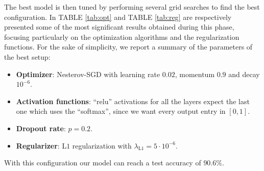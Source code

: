 \documentclass[prl,twocolumn]{revtex4-1}
\newcommand{\tabref}[1]{TABLE \ref{#1}}
\begin{document}
The best model is then tuned by performing several grid searches to find the best configuration.
%
In \tabref{tab:opt} and \tabref{tab:reg} are respectively presented some of the most significant results obtained during this phase, focusing particularly on the optimization algorithms and the regularization functions.
For the sake of simplicity, we report a summary of the parameters of the best setup:
\begin{itemize}
    \itemsep0em
    \item \textbf{Optimizer}: Nesterov-SGD with learning rate $0.02$, momentum $0.9$ and decay $10^{-6}$.
    \item \textbf{Activation functions}: ``relu'' activations for all the layers expect the last one which uses the ``softmax'', since we want every output entry in $[0,1]$.
    \item \textbf{Dropout rate}: $p=0.2$.
    \item \textbf{Regularizer}: L$1$ regularization with $\lambda_\mathrm{L1} = 5\cdot 10^{-6}$.
\end{itemize}
With this configuration our model can reach a test accuracy of $90.6\%$.
\end{document}
